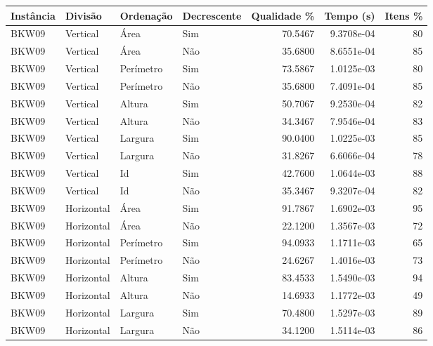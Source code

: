 \begin{tabular}{llllrrr}
    \hline
    Instância & Divisão     & Ordenação & Decrescente & Qualidade \% & Tempo (s)  & Itens \% \\
    \hline
    BKW09     & Vertical    & Área      & Sim         & 70.5467      & 9.3708e-04 & 80       \\
    BKW09     & Vertical    & Área      & Não         & 35.6800      & 8.6551e-04 & 85       \\
    BKW09     & Vertical    & Perímetro & Sim         & 73.5867      & 1.0125e-03 & 80       \\
    BKW09     & Vertical    & Perímetro & Não         & 35.6800      & 7.4091e-04 & 85       \\
    BKW09     & Vertical    & Altura    & Sim         & 50.7067      & 9.2530e-04 & 82       \\
    BKW09     & Vertical    & Altura    & Não         & 34.3467      & 7.9546e-04 & 83       \\
    BKW09     & Vertical    & Largura   & Sim         & 90.0400      & 1.0225e-03 & 85       \\
    BKW09     & Vertical    & Largura   & Não         & 31.8267      & 6.6066e-04 & 78       \\
    BKW09     & Vertical    & Id        & Sim         & 42.7600      & 1.0644e-03 & 88       \\
    BKW09     & Vertical    & Id        & Não         & 35.3467      & 9.3207e-04 & 82       \\
    BKW09     & Horizontal  & Área      & Sim         & 91.7867      & 1.6902e-03 & 95       \\
    BKW09     & Horizontal  & Área      & Não         & 22.1200      & 1.3567e-03 & 72       \\
    BKW09     & Horizontal  & Perímetro & Sim         & 94.0933      & 1.1711e-03 & 65       \\
    BKW09     & Horizontal  & Perímetro & Não         & 24.6267      & 1.4016e-03 & 73       \\
    BKW09     & Horizontal  & Altura    & Sim         & 83.4533      & 1.5490e-03 & 94       \\
    BKW09     & Horizontal  & Altura    & Não         & 14.6933      & 1.1772e-03 & 49       \\
    BKW09     & Horizontal  & Largura   & Sim         & 70.4800      & 1.5297e-03 & 89       \\
    BKW09     & Horizontal  & Largura   & Não         & 34.1200      & 1.5114e-03 & 86       \\

\end{tabular}
